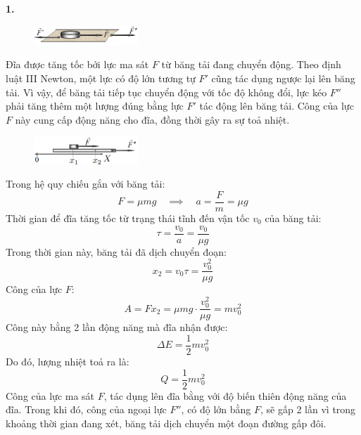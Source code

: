 \noindent\textbf{1.}\\
\begin{figure}[H]
  \centering
  \includegraphics[width=0.35\textwidth]{Figures/Solutions/Fig 1.1.png}
\end{figure}
\noindent Đĩa được tăng tốc bởi lực ma sát $F$ từ băng tải đang chuyển động. Theo định luật III Newton, một lực có độ lớn tương tự $F'$ cũng tác dụng ngược lại lên băng tải. Vì vậy, để băng tải tiếp tục chuyển động với tốc độ không đổi, lực kéo $F''$ phải tăng thêm một lượng đúng bằng lực $F'$ tác động lên băng tải. Công của lực $F$ này cung cấp động năng cho đĩa, đồng thời gây ra sự toả nhiệt.
\begin{figure}[H]
  \centering
  \includegraphics[width=0.35\textwidth]{Figures/Solutions/Fig 1.2.png}
\end{figure}
\noindent Trong hệ quy chiếu gắn với băng tải:
\begin{equation*}
  F = \mu mg \quad \implies \quad a = \frac{F}{m} = \mu g
\end{equation*}
Thời gian để đĩa tăng tốc từ trạng thái tĩnh đến vận tốc $v_0$ của băng tải:
\begin{equation*}
  \tau = \frac{v_0}{a} = \frac{v_0}{\mu g}
\end{equation*}
Trong thời gian này, băng tải đã dịch chuyển đoạn:
\begin{equation*}
  x_2 = v_0 \tau = \frac{v_0^2}{\mu g}
\end{equation*}
Công của lực $F$:
\begin{equation*}
  A = Fx_2 = \mu mg \cdot \frac{v_0^2}{\mu g} = mv_0^2
\end{equation*}
Công này bằng 2 lần động năng mà đĩa nhận được:
\begin{equation*}
  \Delta E = \frac{1}{2}mv_0^2
\end{equation*}
Do đó, lượng nhiệt toả ra là:
\begin{equation*}
  Q = \frac{1}{2}mv_0^2
\end{equation*}
Công của lực ma sát $F$, tác dụng lên đĩa bằng với độ biến thiên động năng của đĩa. Trong khi đó, công của ngoại lực $F''$, có độ lớn bằng $F$, sẽ gấp 2 lần vì trong khoảng thời gian đang xét, băng tải dịch chuyển một đoạn đường gấp đôi.\\


